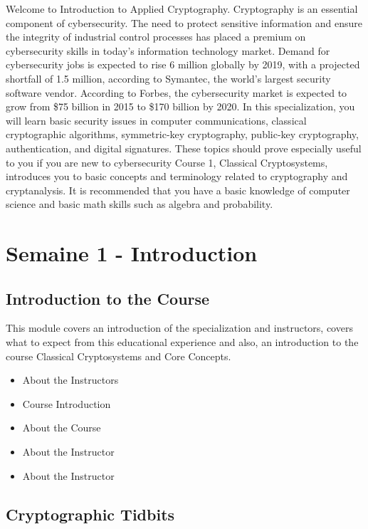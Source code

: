 



Welcome to Introduction to Applied Cryptography.  Cryptography is an essential component of cybersecurity. The need to protect sensitive information and ensure the integrity of industrial control processes has placed a premium on cybersecurity skills in today’s information technology market.  Demand for cybersecurity jobs is expected to rise 6 million globally by 2019, with a projected shortfall of 1.5 million, according to Symantec, the world’s largest security software vendor. According to Forbes, the cybersecurity market is expected to grow from \$75 billion in 2015 to \$170 billion by 2020. In this specialization, you will learn basic security issues in computer communications, classical cryptographic algorithms, symmetric-key cryptography, public-key cryptography, authentication, and digital signatures. These topics should prove especially useful to you if you are new to cybersecurity Course 1, Classical Cryptosystems, introduces you to basic concepts and terminology related to cryptography and cryptanalysis. It is recommended that you have a basic knowledge of computer science and basic math skills such as algebra and probability.


\section*{Semaine 1 - Introduction}

\subsection*{Introduction to the Course}

This module covers an introduction of the specialization and instructors, covers what to expect from this educational experience and also, an introduction to the course Classical Cryptosystems and Core Concepts.

\begin{itemize}[label={$\bullet$}]
   \item About the Instructors
   \item Course Introduction
   \item About the Course
   \item About the Instructor
   \item About the Instructor
\end{itemize}

\subsection*{Cryptographic Tidbits}

